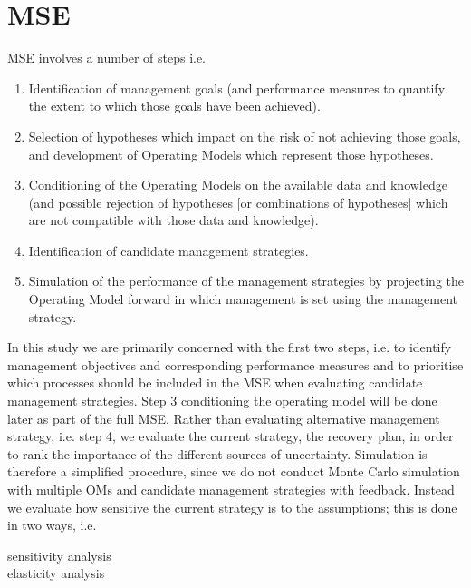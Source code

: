 \documentclass[a4paper,10pt]{article}
\title{}
\begin{document}
\maketitle

\section*{MSE}

MSE involves a number of steps \cite{punt2007developing} i.e.

\begin{enumerate}
 \item Identification of management goals (and performance measures to quantify the extent to which those goals have been achieved).
 \item Selection of hypotheses which impact on the risk of not achieving those goals, and development of Operating Models which represent those hypotheses.
 \item Conditioning of the Operating Models on the available data and knowledge (and possible rejection of hypotheses [or combinations of hypotheses] 
        which are not compatible with those data and knowledge).
 \item  Identification of candidate management strategies.
 \item  Simulation of the performance of the management strategies by projecting the Operating Model forward in which management is 
        set using the management strategy.
\end{enumerate}

In this study we are primarily concerned with the first two steps, i.e. to identify management objectives and corresponding performance 
measures and to prioritise which processes should be included in the MSE when evaluating candidate management strategies. Step 3 conditioning 
the operating model will be done later as part of the full MSE. Rather than evaluating alternative management strategy, i.e. step 4, we evaluate 
the current strategy, the recovery plan, in order to rank the importance of the different sources of uncertainty. 
Simulation is therefore a simplified procedure, since we do not conduct Monte Carlo simulation with multiple OMs and candidate management strategies 
with feedback. Instead we evaluate how sensitive the current strategy is to the assumptions; this is done in two ways, i.e.

\begin{description}
 \item[sensitivity analysis] 
 \item[elasticity analysis] 
\end{description}
\end{document}
